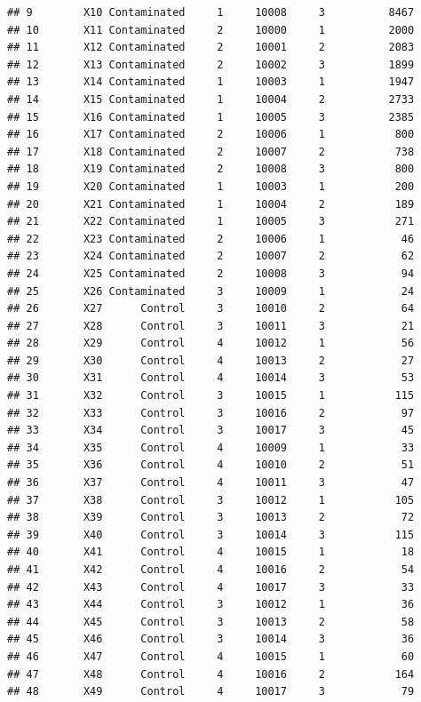\documentclass[10pt,handout,english]{beamer}\usepackage[]{graphicx}\usepackage[]{color}
\makeatletter
\newenvironment{kframe}{%
 \def\at@end@of@kframe{}%
 \ifinner\ifhmode%
  \def\at@end@of@kframe{\end{minipage}}%
  \begin{minipage}{\columnwidth}%
 \fi\fi%
 \def\FrameCommand##1{\hskip\@totalleftmargin \hskip-\fboxsep
 \colorbox{shadecolor}{##1}\hskip-\fboxsep
     \hskip-\linewidth \hskip-\@totalleftmargin \hskip\columnwidth}%
 \MakeFramed {\advance\hsize-\width
   \@totalleftmargin\z@ \linewidth\hsize
   \@setminipage}}%
 {\par\unskip\endMakeFramed%
 \at@end@of@kframe}
\newenvironment{knitrout}{}{} %
\makeatother
\begin{document}
\begin{frame}[fragile]
\begin{knitrout}
\begin{kframe}
\begin{verbatim}
## 9        X10 Contaminated     1     10008     3          8467
## 10       X11 Contaminated     2     10000     1          2000
## 11       X12 Contaminated     2     10001     2          2083
## 12       X13 Contaminated     2     10002     3          1899
## 13       X14 Contaminated     1     10003     1          1947
## 14       X15 Contaminated     1     10004     2          2733
## 15       X16 Contaminated     1     10005     3          2385
## 16       X17 Contaminated     2     10006     1           800
## 17       X18 Contaminated     2     10007     2           738
## 18       X19 Contaminated     2     10008     3           800
## 19       X20 Contaminated     1     10003     1           200
## 20       X21 Contaminated     1     10004     2           189
## 21       X22 Contaminated     1     10005     3           271
## 22       X23 Contaminated     2     10006     1            46
## 23       X24 Contaminated     2     10007     2            62
## 24       X25 Contaminated     2     10008     3            94
## 25       X26 Contaminated     3     10009     1            24
## 26       X27      Control     3     10010     2            64
## 27       X28      Control     3     10011     3            21
## 28       X29      Control     4     10012     1            56
## 29       X30      Control     4     10013     2            27
## 30       X31      Control     4     10014     3            53
## 31       X32      Control     3     10015     1           115
## 32       X33      Control     3     10016     2            97
## 33       X34      Control     3     10017     3            45
## 34       X35      Control     4     10009     1            33
## 35       X36      Control     4     10010     2            51
## 36       X37      Control     4     10011     3            47
## 37       X38      Control     3     10012     1           105
## 38       X39      Control     3     10013     2            72
## 39       X40      Control     3     10014     3           115
## 40       X41      Control     4     10015     1            18
## 41       X42      Control     4     10016     2            54
## 42       X43      Control     4     10017     3            33
## 43       X44      Control     3     10012     1            36
## 44       X45      Control     3     10013     2            58
## 45       X46      Control     3     10014     3            36
## 46       X47      Control     4     10015     1            60
## 47       X48      Control     4     10016     2           164
## 48       X49      Control     4     10017     3            79

\end{verbatim}
\end{kframe}
\end{knitrout}
\end{frame}
\end{document}
